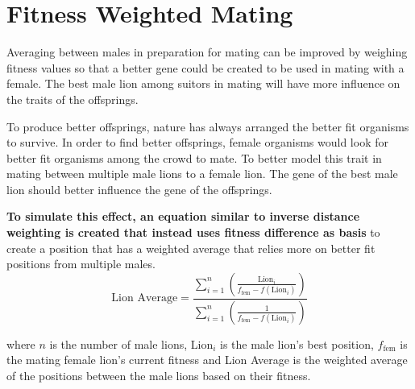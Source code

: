 \section{Fitness Weighted Mating}
\par Averaging between males in preparation for mating can be improved by weighing fitness values so that a better gene could be created to be used in mating with a female. The best male lion among suitors in mating will have more influence on the traits of the offsprings.

\par To produce better offsprings, nature has always arranged the better fit organisms to survive. In order to find better offsprings, female organisms would look for better fit organisms among the crowd to mate. To better model this trait in mating between multiple male lions to a female lion. The gene of the best male lion should better influence the gene of the offsprings.

\par \textbf{To simulate this effect, an equation similar to inverse distance weighting \cite{idw} is created that instead uses fitness difference as basis} to create a position that has a weighted average that relies more on better fit positions from multiple males. \cite{idw2}
$$
\text{Lion Average} = \frac{\displaystyle\sum_{i=1}^{n} \left( \frac{\text{Lion}_i}{f_{\text{fem}} - f(\text{Lion}_i)} \right)}{\displaystyle\sum_{i=1}^{n} \left( \frac{1}{f_{\text{fem}} - f(\text{Lion}_i)} \right)}
$$

where $n$ is the number of male lions, Lion$_i$ is the male lion's best position, $f_{\text{fem}}$ is the mating female lion's current fitness and Lion Average is the weighted average of the positions between the male lions based on their fitness.
